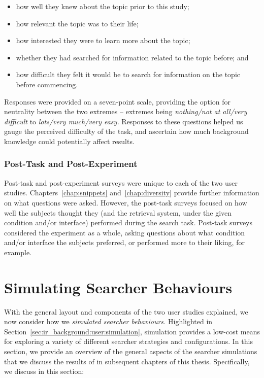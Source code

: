 \begin{itemize}
    \item{how well they knew about the topic prior to this study;}
    \item{how relevant the topic was to their life;}
    \item{how interested they were to learn more about the topic;}
    \item{whether they had searched for information related to the topic before; and}
    \item{how difficult they felt it would be to search for information on the topic before commencing.}
\end{itemize}

Responses were provided on a seven-point scale, providing the option for neutrality between the two extremes -- extremes being \emph{nothing/not at all/very difficult} to \emph{lots/very much/very easy.} Responses to these questions helped us gauge the perceived difficulty of the task, and ascertain how much background knowledge could potentially affect results.

\subsubsection{Post-Task and Post-Experiment}
Post-task and post-experiment surveys were unique to each of the two user studies. Chapters~\ref{chap:snippets} and~\ref{chap:diversity} provide further information on what questions were asked. However, the post-task surveys focused on how well the subjects thought they (and the retrieval system, under the given condition and/or interface) performed during the search task. Post-task surveys considered the experiment as a whole, asking questions about what condition and/or interface the subjects preferred, or performed more to their liking, for example.

\section{Simulating Searcher Behaviours}\label{chap:csm:method:simulation}
With the general layout and components of the two user studies explained, we now consider how we \emph{simulated searcher behaviours.} Highlighted in Section~\ref{sec:ir_background:user:simulation}, simulation provides a low-cost means for exploring a variety of different searcher strategies and configurations. In this section, we provide an overview of the general aspects of the  searcher simulations that we discuss the results of in subsequent chapters of this thesis. Specifically, we discuss in this section:

